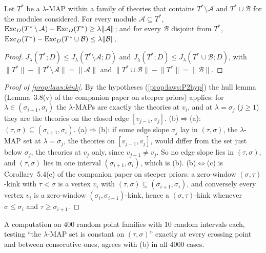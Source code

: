 \begin{proposition}\label{prop:laws:slopes}
Let $T^*$ be a $\lambda$-MAP within a family of theories that contains $T^*\setminus\mathcal A$ and $T^*\cup\mathcal B$ for the modules considered. For every module $\mathcal A\subseteq T^*$, $\mathrm{Exc}_D(T^*\setminus\mathcal A)-\mathrm{Exc}_D(T^*)\ge\lambda\lVert\mathcal A\rVert$; and for every $\mathcal B$ disjoint from $T^*$, $\mathrm{Exc}_D(T^*)-\mathrm{Exc}_D(T^*\cup\mathcal B)\le\lambda\lVert\mathcal B\rVert$.
\end{proposition}

\begin{proof}
$J_\lambda(T^*;D)\le J_\lambda(T^*\setminus\mathcal A;D)$ and $J_\lambda(T^*;D)\le J_\lambda(T^*\cup\mathcal B;D)$, with $\lVert T^*\rVert-\lVert T^*\setminus\mathcal A\rVert=\lVert\mathcal A\rVert$ and $\lVert T^*\cup\mathcal B\rVert-\lVert T^*\rVert=\lVert\mathcal B\rVert$.
\end{proof}

\begin{proof}[Proof of \cref{prop:laws:kink}]
By the hypotheses (\cref{prop:laws:P2hyp}) the hull lemma (Lemma~3.8(v) of the companion paper on steeper priors) applies: for $\lambda\in(\sigma_{i+1},\sigma_i)$ the $\lambda$-MAPs are exactly the theories at $v_i$, and at $\lambda=\sigma_j$ ($j\ge1$) they are the theories on the closed edge $[v_{j-1},v_j]$. (b)$\Rightarrow$(a): $(\tau,\sigma)\subseteq(\sigma_{i+1},\sigma_i)$. (a)$\Rightarrow$(b): if some edge slope $\sigma_j$ lay in $(\tau,\sigma)$, the $\lambda$-MAP set at $\lambda=\sigma_j$, the theories on $[v_{j-1},v_j]$, would differ from the set just below $\sigma_j$, the theories at $v_j$ only, since $v_{j-1}\ne v_j$. So no edge slope lies in $(\tau,\sigma)$, and $(\tau,\sigma)$ lies in one interval $(\sigma_{i+1},\sigma_i)$, which is (b). (b)$\Leftrightarrow$(c) is Corollary~5.4(c) of the companion paper on steeper priors: a zero-window $(\sigma,\tau)$-kink with $\tau<\sigma$ is a vertex $v_i$ with $(\tau,\sigma)\subseteq(\sigma_{i+1},\sigma_i)$, and conversely every vertex $v_i$ is a zero-window $(\sigma_i,\sigma_{i+1})$-kink, hence a $(\sigma,\tau)$-kink whenever $\sigma\le\sigma_i$ and $\tau\ge\sigma_{i+1}$.
\end{proof}

A computation on $400$ random point families with $10$ random intervals each, testing ``the $\lambda$-MAP set is constant on $(\tau,\sigma)$'' exactly at every crossing point and between consecutive ones, agrees with (b) in all $4000$ cases.

